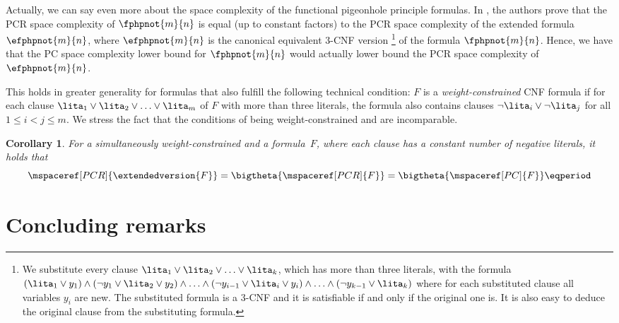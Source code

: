\documentclass[11pt]{article}
\numberwithin{equation}{section}
\newtheorem{corollary}[theorem]{Corollary}
\theoremstyle{definition}
\theoremstyle{plain}
\begin{document}
%
%
%
%
%
%
%

Actually, we can say even more about the space complexity of the
functional pigeonhole principle formulas. In \cite{FLNRT15SpaceCplx},
the authors prove that the PCR space complexity of $\fphpnot{m}{n}$ is
equal (up to constant factors) to the PCR space complexity of the
extended formula $\efphpnot{m}{n}$, where $\efphpnot{m}{n}$ is the
canonical equivalent $3$-CNF version%
%
\footnote{We substitute every clause $\lita_{1}\lor\lita_{2}\lor \ldots \lor
  \lita_{k}$, which has more than three literals, with the formula
$(\lita_{1}\lor y_{1}) \land
(\lnot{y_{1}}\lor\lita_{2}\lor y_{2})
\land \ldots \land
(\lnot{y_{i-1}}\lor\lita_{i}\lor y_{i})
\land \ldots \land
(\lnot{y_{k-1}}\lor\lita_{k}) $
%
where for each substituted clause all variables $y_{i}$ are new. The
substituted formula is a $3$-CNF and it is satisfiable if and only if
the original one is. It is also easy to deduce the original clause
from the substituting formula.}
%
of the formula $\fphpnot{m}{n}$. Hence, we have that the PC
space complexity lower bound for $\fphpnot{m}{n}$ would actually lower
bound the PCR space complexity of $\efphpnot{m}{n}$.

This holds in greater generality for \varweightconstrained{} formulas
that also fulfill the following technical condition: $F$ is a
\emph{weight-constrained} CNF formula if for each clause $\lita_{1} \lor
\lita_{2} \lor \ldots \lor \lita_{m}$ of $F$ with more than three literals,
the formula also contains clauses $\lnot{\lita_{i}} \lor \lnot{\lita_{j}}$ for
all $1 \leq i < j \leq m$.
%
We stress the fact that the conditions of being weight-constrained and \varweightconstrained{} are incomparable.

\begin{corollary}
  For a simultaneously weight-constrained and a
  \varweightconstrained{} formula~$F$, where each clause has a constant
  number of negative literals, it holds that
  \begin{equation*}
    \mspaceref[PCR]{\extendedversion{F}} = \bigtheta{\mspaceref[PCR]{F}} = \bigtheta{\mspaceref[PC]{F}} \eqperiod
  \end{equation*}
\end{corollary}
 
%

\section{Concluding remarks}
\label{sec:concluding-remarks}
\end{document}
